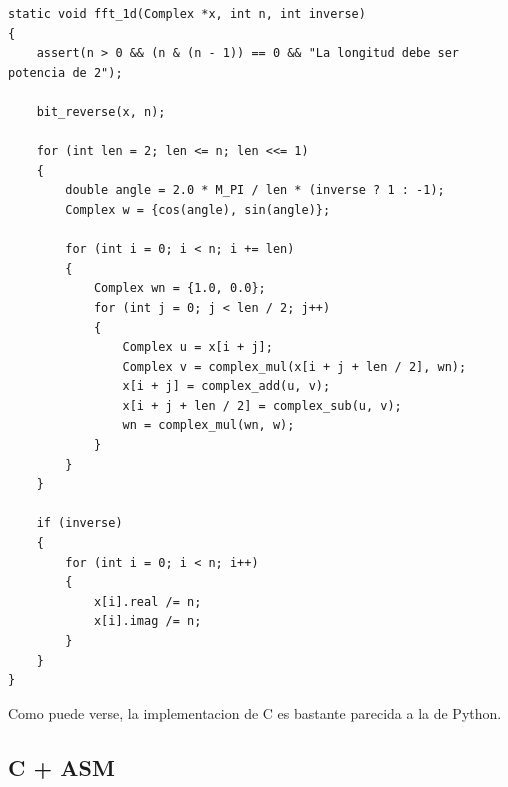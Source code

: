 \documentclass[a4paper]{article}
\begin{document}
\begin{verbatim}
static void fft_1d(Complex *x, int n, int inverse)
{
    assert(n > 0 && (n & (n - 1)) == 0 && "La longitud debe ser potencia de 2");

    bit_reverse(x, n);

    for (int len = 2; len <= n; len <<= 1)
    {
        double angle = 2.0 * M_PI / len * (inverse ? 1 : -1);
        Complex w = {cos(angle), sin(angle)};

        for (int i = 0; i < n; i += len)
        {
            Complex wn = {1.0, 0.0};
            for (int j = 0; j < len / 2; j++)
            {
                Complex u = x[i + j];
                Complex v = complex_mul(x[i + j + len / 2], wn);
                x[i + j] = complex_add(u, v);
                x[i + j + len / 2] = complex_sub(u, v);
                wn = complex_mul(wn, w);
            }
        }
    }

    if (inverse)
    {
        for (int i = 0; i < n; i++)
        {
            x[i].real /= n;
            x[i].imag /= n;
        }
    }
}
\end{verbatim}

Como puede verse, la implementacion de C es bastante parecida a la de Python.

\subsection{C + ASM}
\end{document}
